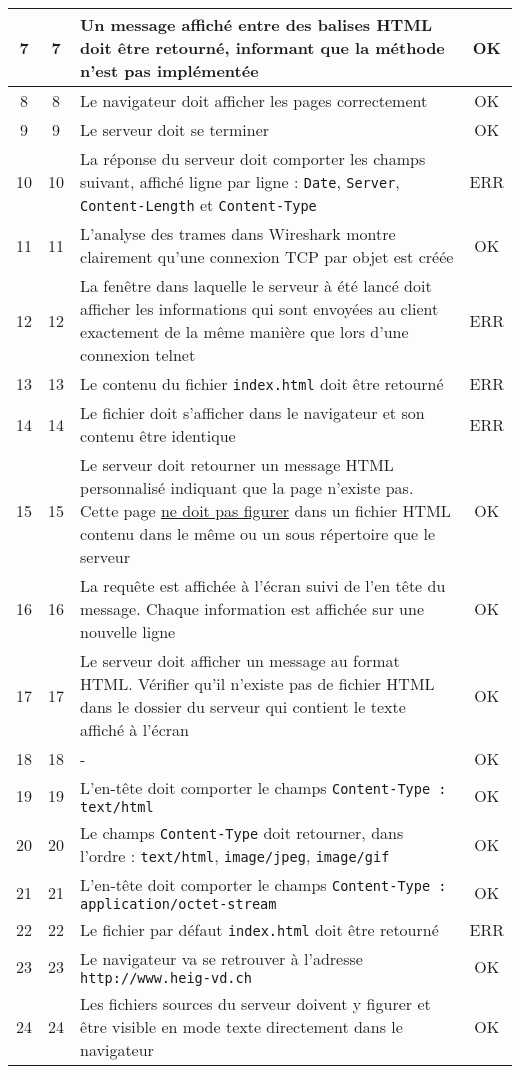 \documentclass[a4paper, 11pt]{article}
\begin{document}
\begin{longtable}{ c | c | p{14cm} | c}
7 & 7 & Un message affiché entre des balises HTML doit être retourné, informant que la méthode n'est pas implémentée & OK \\
\hline
8 & 8 & Le navigateur doit afficher les pages correctement & OK \\
\hline
9 & 9 & Le serveur doit se terminer & OK \\
\hline
10 & 10 & La réponse du serveur doit comporter les champs suivant, affiché ligne par ligne : \texttt{Date}, \texttt{Server}, \texttt{Content-Length} et \texttt{Content-Type} & ERR \\
\hline
11 & 11 & L'analyse des trames dans Wireshark montre clairement qu'une connexion TCP par objet est créée & OK \\
\hline
12 & 12 & La fenêtre dans laquelle le serveur à été lancé doit afficher les informations qui sont envoyées au client exactement de la même manière que lors d'une connexion telnet & ERR \\
\hline
13 & 13 & Le contenu du fichier \texttt{index.html} doit être retourné & ERR \\
\hline
14 & 14 & Le fichier doit s'afficher dans le navigateur et son contenu être identique & ERR \\
\hline
15 & 15 & Le serveur doit retourner un message HTML personnalisé indiquant que la page n'existe pas. Cette page \underline{ne doit pas figurer} dans un fichier HTML contenu dans le même ou un sous répertoire que le serveur & OK \\
\hline
16 & 16 & La requête est affichée à l'écran suivi de l'en tête du message. Chaque information est affichée sur une nouvelle ligne & OK \\
\hline
17 & 17 & Le serveur doit afficher un message au format HTML. Vérifier qu'il n'existe pas de fichier HTML dans le dossier du serveur qui contient le texte affiché à l'écran & OK \\
\hline
18 & 18 & - & OK \\
\hline
19 & 19 & L'en-tête doit comporter le champs \texttt{Content-Type : text/html} & OK \\
\hline
20 & 20 & Le champs \texttt{Content-Type} doit retourner, dans l'ordre : \texttt{text/html}, \texttt{image/jpeg}, \texttt{image/gif} & OK \\
\hline
21 & 21 & L'en-tête doit comporter le champs \texttt{Content-Type : application/octet-stream} & OK \\
\hline
22 & 22 & Le fichier par défaut \texttt{index.html} doit être retourné & ERR \\
\hline
23 & 23 & Le navigateur va se retrouver à l'adresse \texttt{http://www.heig-vd.ch} & OK \\ 
\hline
24 & 24 & Les fichiers sources du serveur doivent y figurer et être visible en mode texte directement dans le navigateur & OK \\
\hline %
\end{longtable}
\end{document}
